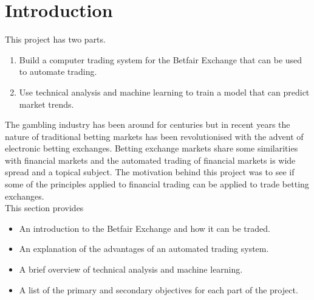 \chapter{Introduction}
	This project has two parts. 
	
		\begin{enumerate}
			\item Build a computer trading system for the Betfair Exchange that can be used to automate trading.
			\item Use technical analysis and machine learning to train a model that can predict market trends.\\
		\end{enumerate}			

	The gambling industry has been around for centuries but in recent years the nature of traditional betting markets has been revolutionised with the advent of electronic betting exchanges. Betting exchange markets share some similarities with financial markets and the automated trading of financial markets is wide spread and a topical subject. The motivation behind this project was to see if some of the principles applied to financial trading can be applied to trade betting exchanges.\\
	
	This section provides 
		\begin{itemize}
			\item An introduction to the Betfair Exchange and how it can be traded.
			\item An explanation of the advantages of an automated trading system.
			\item A brief overview of technical analysis and machine learning.
			\item A list of the primary and secondary objectives for each part of the project.
		\end{itemize}			

	
	
		
	
	